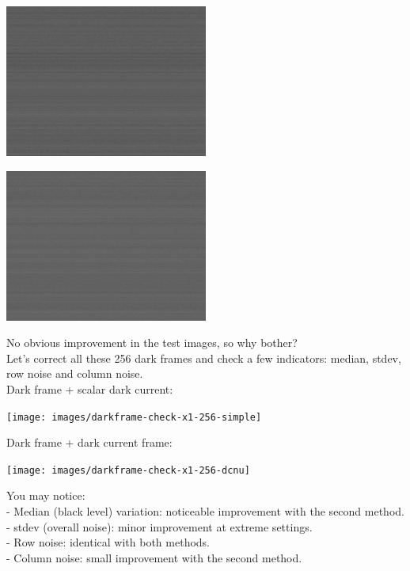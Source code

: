 \begin{center}
\includegraphics[height=5cm]{images/blackframes-gainx1-offset2047-5ms-01-darkcurrent-no-blackcol}
\end{center}

\begin{center}
\includegraphics[height=5cm]{images/blackframes-gainx1-offset2047-64ms-01-darkcurrent-no-blackcol}
\end{center}

No obvious improvement in the test images, so why bother?\\

Let's correct all these 256 dark frames and check a few indicators: median, stdev, row noise and column noise.\\ 

Dark frame + scalar dark current: 
\begin{center}
\texttt{[image: images/darkframe-check-x1-256-simple]}
\end{center}


Dark frame + dark current frame:
\begin{center}
\texttt{[image: images/darkframe-check-x1-256-dcnu]}
\end{center}

You may notice:\\

- Median (black level) variation: noticeable improvement with the second method.\\
- stdev (overall noise): minor improvement at extreme settings.\\
- Row noise: identical with both methods.\\
- Column noise: small improvement with the second method.\\

